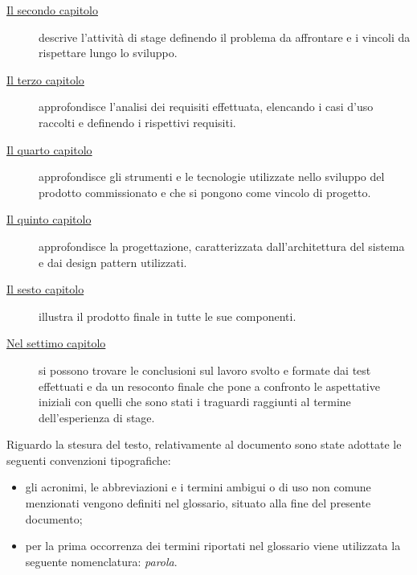 \begin{description}
\item[{\hyperref[cap:descrizione-stage]{Il secondo capitolo}}] descrive l'attività di stage definendo il problema da affrontare e i vincoli da rispettare lungo lo sviluppo.
    
\item[{\hyperref[cap:analisi-requisiti]{Il terzo capitolo}}] approfondisce l'analisi dei requisiti effettuata, elencando i casi d'uso raccolti e definendo i rispettivi requisiti.
    
\item[{\hyperref[cap:strumenti-utilizzati]{Il quarto capitolo}}] approfondisce gli strumenti e le tecnologie utilizzate nello sviluppo del prodotto commissionato e che si pongono come vincolo di progetto.
    
\item[{\hyperref[cap:progettazione]{Il quinto capitolo}}] approfondisce la progettazione, caratterizzata dall'architettura del sistema e dai design pattern utilizzati.
    
\item[{\hyperref[cap:prodotto-finale]{Il sesto capitolo}}] illustra il prodotto finale in tutte le sue componenti.
    
\item[{\hyperref[cap:conclusioni]{Nel settimo capitolo}}] si possono trovare le conclusioni sul lavoro svolto e formate dai test effettuati e da un resoconto finale che pone a confronto le aspettative iniziali con quelli che sono stati i traguardi raggiunti al termine dell'esperienza di stage.
\end{description}

\noindent Riguardo la stesura del testo, relativamente al documento sono state adottate le seguenti convenzioni tipografiche:
\begin{itemize}
	\item gli acronimi, le abbreviazioni e i termini ambigui o di uso non comune menzionati vengono definiti nel glossario, situato alla fine del presente documento;
	\item per la prima occorrenza dei termini riportati nel glossario viene utilizzata la seguente nomenclatura: \emph{parola}\glsfirstoccur.
\end{itemize}
